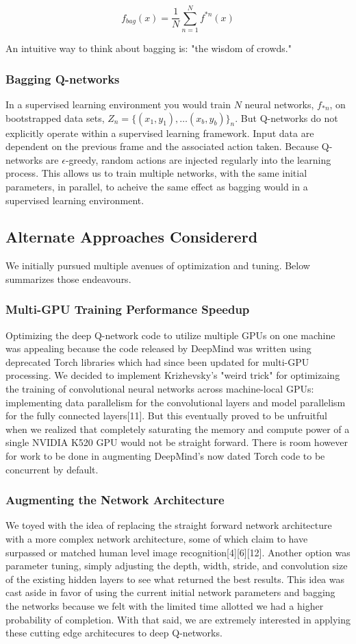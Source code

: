 \documentclass{article} %
\begin{document}
\[
f_{bag}(x) = \frac{1}{N} \sum_{n=1}^{N} f^{*n}(x)
\]

An intuitive way to think about bagging is: "the wisdom of crowds."

\subsubsection*{Bagging Q-networks}
In a supervised learning environment you would train $N$ neural networks, $f_{*n}$, on 
bootstrapped data sets, $ Z_{n} = \{ (x_{1},y_{1}), \dots (x_{b}, y_{b}) \}_n $. 
But Q-networks do not explicitly operate within a supervised learning framework. 
Input data are dependent on the previous frame and the associated action taken.
Because Q-networks are $\epsilon$-greedy, random actions are injected regularly into 
the learning process. This allows us to train multiple networks, with the same 
initial parameters, in parallel, to acheive the same effect as bagging would in a 
supervised learning environment.

\subsection{Alternate Approaches Considererd}
We initially pursued multiple avenues of optimization and tuning. Below summarizes those
endeavours.

\subsubsection*{Multi-GPU Training Performance Speedup}
Optimizing the deep Q-network code to utilize multiple GPUs on one machine was appealing
because the code released by DeepMind was written using deprecated Torch libraries which
had since been updated for multi-GPU processing. We decided to implement Krizhevsky's 
"weird trick" for optimizaing the training of convolutional neural networks across machine-local 
GPUs: implementing data parallelism for the convolutional layers and model parallelism for the 
fully connected layers[11]. But this eventually proved to be unfruitful when we realized 
that completely saturating the memory and compute power of a single NVIDIA K520 GPU would not be straight 
forward. There is room however for work to be done in augmenting DeepMind's now dated
Torch code to be concurrent by default.

\subsubsection*{Augmenting the Network Architecture}
We toyed with the idea of replacing the straight forward network architecture with a more 
complex network architecture, some of which claim to have surpassed or matched human level
image recognition[4][6][12]. Another option was parameter tuning, simply adjusting the depth, 
width, stride, and convolution size of the existing hidden layers to see what returned the best results. 
This idea was cast aside in favor of using the current initial network parameters and bagging the 
networks because we felt with the limited time allotted we had a higher probability of completion. 
With that said, we are extremely interested in applying these cutting edge architecures to 
deep Q-networks.
\end{document}
